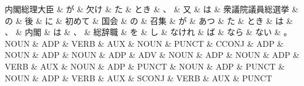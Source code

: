\documentclass[tikz,border=5pt]{standalone}
\begin{document}
\small
\begin{dependency}[edge unit distance=12.0pt]
    \begin{deptext}[column sep=0.5em]
        内閣総理大臣 \& が \& 欠け \& た \& とき \& 、 \& 又 \& は \& 衆議院議員総選挙 \& の \& 後 \& に \& 初めて \& 国会 \& の \& 召集 \& が \& あつ \& た \& とき \& は \& 、 \& 内閣 \& は \& 、 \& 総辞職 \& を \& し \& なけれ \& ば \& なら \& ない \& 。\\
        NOUN \& ADP \& VERB \& AUX \& NOUN \& PUNCT \& CCONJ \& ADP \& NOUN \& ADP \& NOUN \& ADP \& ADV \& NOUN \& ADP \& NOUN \& ADP \& VERB \& AUX \& NOUN \& ADP \& PUNCT \& NOUN \& ADP \& PUNCT \& NOUN \& ADP \& VERB \& AUX \& SCONJ \& VERB \& AUX \& PUNCT\\
    \end{deptext}
\end{dependency}
\end{document}
